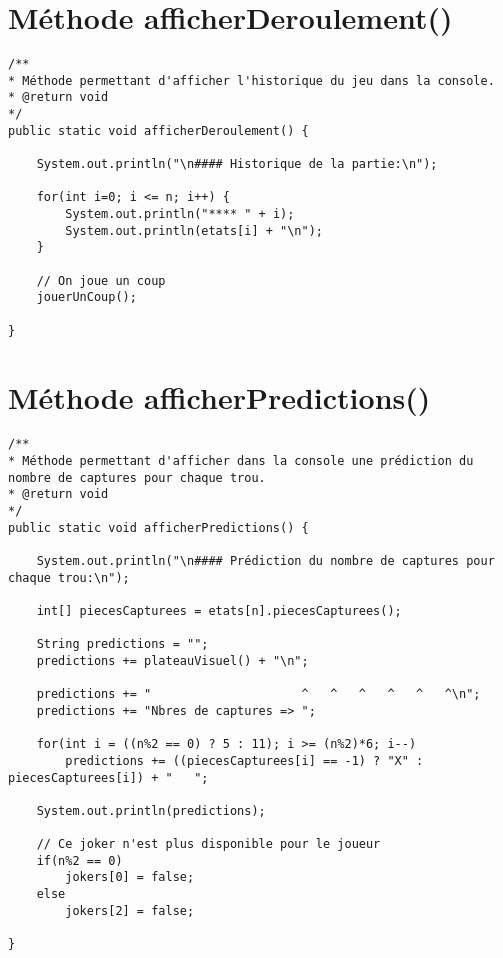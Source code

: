 \documentclass[11pt,a4paper]{report}
\begin{document}
        \newpage

    \section{Méthode afficherDeroulement()}
        \begin{lstlisting}
/**
* Méthode permettant d'afficher l'historique du jeu dans la console.
* @return void
*/
public static void afficherDeroulement() {

    System.out.println("\n#### Historique de la partie:\n");

    for(int i=0; i <= n; i++) {
        System.out.println("**** " + i);
        System.out.println(etats[i] + "\n");
    }

    // On joue un coup
    jouerUnCoup();

}
        \end{lstlisting}

    \section{Méthode afficherPredictions()}
        \begin{lstlisting}
/**
* Méthode permettant d'afficher dans la console une prédiction du nombre de captures pour chaque trou.
* @return void
*/
public static void afficherPredictions() {

    System.out.println("\n#### Prédiction du nombre de captures pour chaque trou:\n");

    int[] piecesCapturees = etats[n].piecesCapturees();

    String predictions = "";
    predictions += plateauVisuel() + "\n";

    predictions += "                     ^   ^   ^   ^   ^   ^\n";
    predictions += "Nbres de captures => ";

    for(int i = ((n%2 == 0) ? 5 : 11); i >= (n%2)*6; i--)
        predictions += ((piecesCapturees[i] == -1) ? "X" : piecesCapturees[i]) + "   ";

    System.out.println(predictions);

    // Ce joker n'est plus disponible pour le joueur
    if(n%2 == 0)
        jokers[0] = false;
    else
        jokers[2] = false;

}
        \end{lstlisting}

        \newpage
\end{document}

